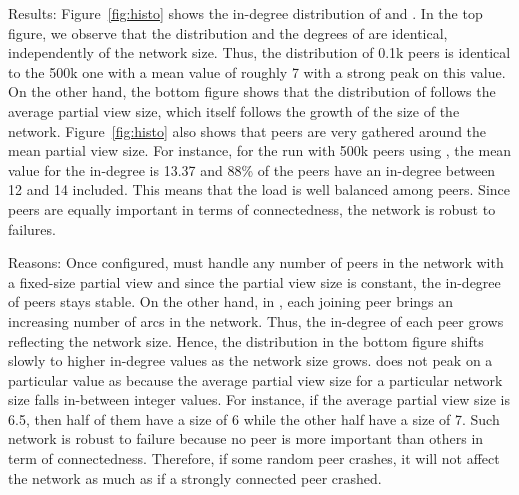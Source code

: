\begin{asparadesc}
\item[Results:] Figure~\ref{fig:histo} shows the in-degree
  distribution of \CYCLON and \SPRAY. In the top figure, we observe
  that the distribution and the degrees of \CYCLON are identical,
  independently of the network size. Thus, the distribution of 0.1k
  peers is identical to the 500k one with a mean value of roughly 7
  with a strong peak on this value. On the other hand, the bottom
  figure shows that the distribution of \SPRAY follows the average
  partial view size, which itself follows the growth of the size of
  the network. Figure~\ref{fig:histo} also shows that peers are very
  gathered around the mean partial view size. For instance, for the
  run with 500k peers using \SPRAY, the mean value for the in-degree
  is 13.37 and 88\% of the peers have an in-degree between 12 and 14
  included. This means that the load is well balanced among
  peers. Since peers are equally important in terms of connectedness,
  the network is robust to failures.
\item[Reasons:] Once configured, \CYCLON must handle any number of
  peers in the network with a fixed-size partial view and since the
  partial view size is constant, the in-degree of peers stays
  stable. 
  On the other hand, in \SPRAY, each joining peer brings an increasing
  number of arcs in the network. Thus, the in-degree of each peer
  grows reflecting the network size. Hence, the distribution in the
  bottom figure shifts slowly to higher in-degree values as the
  network size grows.  \SPRAY does not peak on a particular value as
  \CYCLON because the average partial view size for a particular
  network size falls in-between integer values. For instance, if the
  average partial view size is 6.5, then half of them have a size of 6
  while the other half have a size of 7. Such network is robust to
  failure because no peer is more important than others in term of
  connectedness. Therefore, if some random peer crashes, it will not
  affect the network as much as if a strongly connected peer crashed.
\end{asparadesc}




